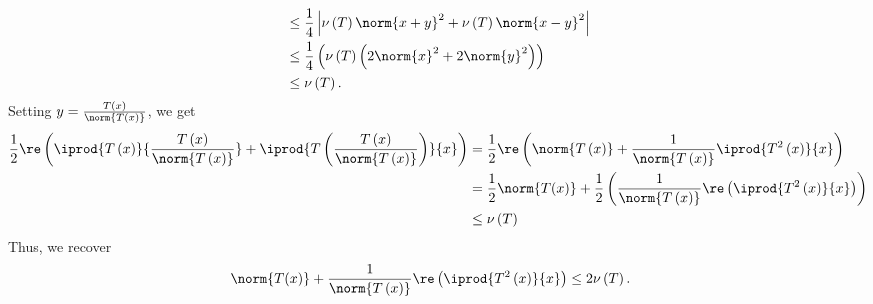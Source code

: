 \documentclass[10pt]{mypackage}
\begin{document}
\begin{solution}
\begin{enumerate}[(i)]
\begin{align*}
                                                                                                    &\leq \frac{1}{4}\left\vert \nu\left(T\right)\norm{x+y}^2 + \nu\left(T\right)\norm{x-y}^2 \right\vert\\
                                                                                                    &\leq \frac{1}{4}\left(\nu\left(T\right) \left(2\norm{x}^2 + 2\norm{y}^2\right)\right)\\
                                                                                                    &\leq \nu\left(T\right).
      \end{align*}
      Setting $y = \frac{T\left(x\right)}{\norm{T\left(x\right)}}$, we get
      \begin{align*}
        \frac{1}{2}\re\left( \iprod{T\left(x\right)}{\frac{T\left(x\right)}{\norm{T\left(x\right)}}} + \iprod{T\left(\frac{T\left(x\right)}{\norm{T\left(x\right)}}\right)}{x}\right) &= \frac{1}{2}\re\left(\norm{T\left(x\right)} + \frac{1}{\norm{T\left(x\right)}}\iprod{T^2\left(x\right)}{x}\right)\\
                                                                                                                                                                                                                         &= \frac{1}{2}\norm{T(x)} + \frac{1}{2}\left(\frac{1}{\norm{T\left(x\right)}} \re\left( \iprod{T^2\left(x\right)}{x}\right)\right)\\
                                                                                                                                                                                                                                                                                                                                                                                                                                                                                                                                                                                                                                                                                                                                                                                                                                                                       &\leq \nu\left(T\right)
      \end{align*}
      Thus, we recover
      \begin{align*}
        \norm{T(x)} + \frac{1}{\norm{T\left(x\right)}}\re\left( \iprod{T^2\left(x\right)}{x}\right) &\leq 2\nu\left(T\right).

\end{align*}
\end{enumerate}
\end{solution}
\end{document}
